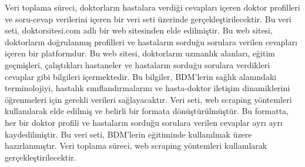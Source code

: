 Veri toplama süreci, doktorların hastalara verdiği cevapları içeren doktor profilleri ve soru-cevap verilerini içeren bir veri seti üzerinde gerçekleştirilecektir. Bu veri seti, doktorsitesi.com adlı bir web sitesinden elde edilmiştir. Bu web sitesi, doktorların doğrulanmış profilleri ve hastaların sorduğu sorulara verilen cevapları içeren bir platformdur. Bu web sitesi, doktorların uzmanlık alanları, eğitim geçmişleri, çalıştıkları hastaneler ve hastaların sorduğu sorulara verdikleri cevaplar gibi bilgileri içermektedir. Bu bilgiler, BDM'lerin sağlık alanındaki terminolojiyi, hastalık sınıflandırmalarını ve hasta-doktor iletişim dinamiklerini öğrenmeleri için gerekli verileri sağlayacaktır. Veri seti, web scraping yöntemleri kullanılarak elde edilmiş ve belirli bir formata dönüştürülmüştür. Bu formatta, her bir doktor profili ve hastaların sorduğu sorulara verilen cevaplar ayrı ayrı kaydedilmiştir. Bu veri seti, BDM'lerin eğitiminde kullanılmak üzere hazırlanmıştır. Veri toplama süreci, web scraping yöntemleri kullanılarak gerçekleştirilecektir.